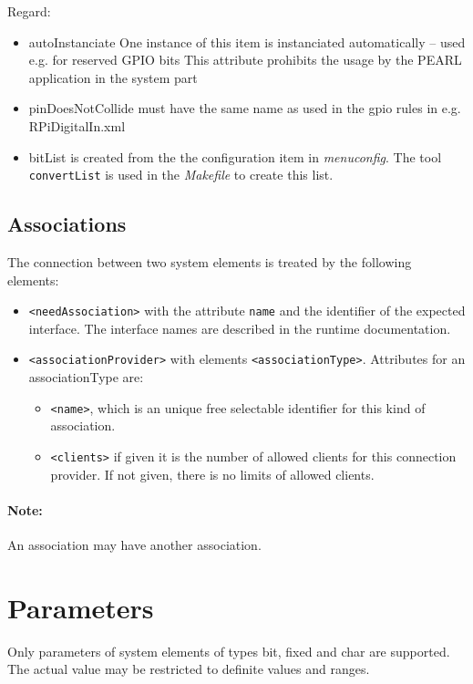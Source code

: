 Regard:
\begin{itemize}
\item autoInstanciate
  One instance of this item is instanciated automatically -- used e.g. 
  for reserved  GPIO bits
  This attribute prohibits the usage by the PEARL application in the system part
\item pinDoesNotCollide must have  the same name as used in the gpio rules in 
   e.g. RPiDigitalIn.xml
\item bitList is created from the the configuration item in \textit{menuconfig}.
The tool \texttt{convertList} is used in the \textit{Makefile} to create this list.
\end{itemize}

\subsection{Associations}
The connection between two system elements is treated by the following
elements:

\begin{itemize}
\item \verb|<needAssociation>| with the attribute 
 \verb|name| and the identifier of the expected interface. The 
  interface names are described in the runtime documentation. 
\item \verb|<associationProvider>|  with elements \verb|<associationType>|.
  Attributes for an associationType are:
  \begin{itemize}
   \item  \verb|<name>|,  which is an unique free selectable
     identifier for this kind of  association.
   \item \verb|<clients>|  if given it is the number of allowed
      clients for this connection provider. If not given, there is no
      limits of allowed clients.
   \end{itemize} 
\end{itemize}

\paragraph{Note:} An association may have another association.
 
\section{Parameters}
Only parameters of system elements of types bit, fixed and char are supported.
The actual value may be restricted to definite values and ranges.

